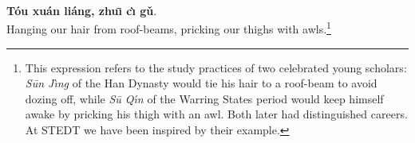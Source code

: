 \section*{}
\epigraph{\\
\textbf{Tóu xuán liáng, zhuı̄ cı̀ gǔ}.\\
Hanging our hair from roof-beams, pricking our thighs with awls.\footnote{This expression refers to the study practices of two celebrated young scholars: \textit{Sūn Jı̀ng}  of the Han Dynasty would tie his hair to a roof-beam to avoid dozing off, while \textit{Sū Qı́n}  of the Warring States period would keep himself awake by pricking his thigh with an awl. Both later had distinguished careers. At STEDT we have been inspired by their example.}}{}